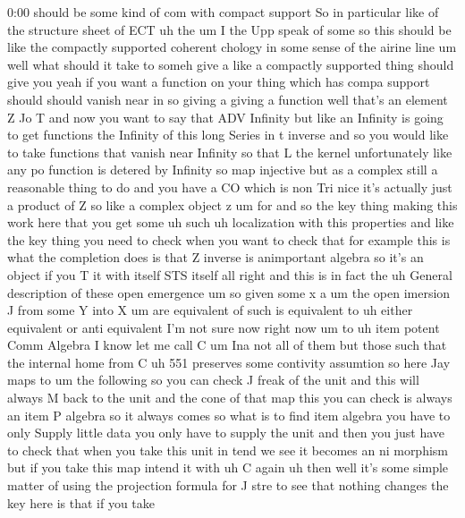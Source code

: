 \begin{unfinished}{0:00}
should  be  some  kind  of  com  with  compact
support  So  in
particular  like  of  the  structure
sheet  of
ECT  uh
the  um  I  the  Upp  speak  of
some  so  this  should  be  like  the
compactly  supported  coherent  chology  in
some  sense  of  the  airine  line  um  well
what  should  it  take  to  someh  give  a  like
a  compactly  supported  thing  should  give
you  yeah  if  you  want  a  function  on  your
thing  which  has  compa  support  should
should  vanish  near  in  so  giving  a  giving
a  function  well  that's  an  element  Z  Jo  T
and  now  you  want  to  say  that  ADV
Infinity  but  like  an  Infinity  is  going
to  get  functions  the  Infinity  of  this
long  Series  in  t  inverse  and  so  you
would  like  to  take  functions  that  vanish
near  Infinity  so  that  L  the
kernel  unfortunately  like  any  po
function  is  detered  by  Infinity  so  map
injective  but  as  a  complex  still  a
reasonable  thing  to  do  and
you  have  a  CO  which  is  non  Tri
nice  it's  actually  just  a  product  of  Z
so  like  a  complex  object  z
um
for
and  so  the  key  thing  making  this  work
here  that  you  get
some  uh
such  uh  localization  with  this
properties  and  like  the  key  thing  you
need  to  check  when  you  want  to  check
that  for  example  this  is  what  the
completion  does  is  that  Z  inverse  is
animportant
algebra  so  it's  an  object  if  you  T  it
with  itself  STS
itself  all  right  and  this  is  in  fact  the
uh  General  description  of  these  open
emergence
um
so
given  some
x  a
um  the  open
imersion  J  from  some
Y  into  X
um
are
equivalent  of
such  is  equivalent
to
uh  either  equivalent  or  anti  equivalent
I'm  not  sure  now  right  now  um
to  uh  item
potent  Comm
Algebra  I
know  let  me  call  C  um
Ina  not  all  of  them  but  those  such
that  the  internal
home  from
C  uh
551
preserves  some  contivity
assumtion  so  here
Jay  maps  to  um  the  following  so  you  can
check  J  freak  of  the  unit
and  this  will  always  M  back  to  the  unit
and  the  cone  of  that
map  this  you  can  check  is  always  an  item
P  algebra  so  it  always  comes  so  what
is  to  find  item  algebra  you  have  to  only
Supply  little  data  you  only  have  to
supply  the  unit  and  then  you  just  have
to  check  that  when  you  take  this  unit  in
tend  we  see  it  becomes  an  ni
morphism  but  if  you  take  this  map  intend
it  with  uh  C  again  uh  then  well  it's
some  simple  matter  of  using  the
projection  formula  for  J  stre  to  see
that  nothing
changes  the  key  here  is  that  if  you  take

\end{unfinished}
